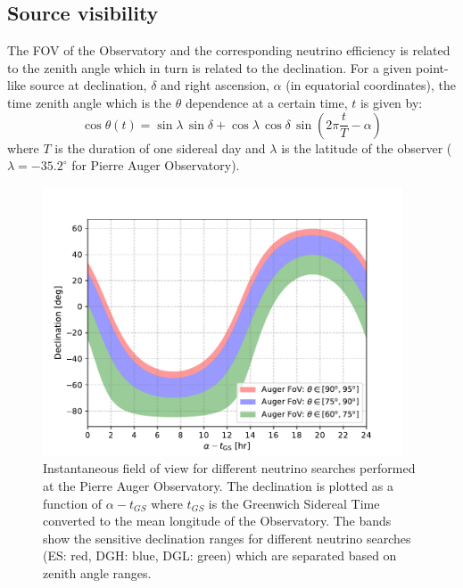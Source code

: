 \subsection{Source visibility}
\label{subsec:psource_coverage}
The \gls{FOV} of the Observatory and the corresponding neutrino efficiency is related to the zenith angle which in turn is related to the declination. For a given point-like source at declination, $\delta$ and right ascension, $\alpha$ (in equatorial coordinates), the time zenith angle which is the $\theta$ dependence at a certain time, $t$ is given by:
\begin{equation}
  \label{eq:zenith_angle_time}
  \cos \theta(t) = \sin \lambda \,\sin \delta+ \cos \lambda \, \cos \delta \,\sin (2\pi \frac{t}{T} - \alpha)
\end{equation} 
where $T$ is the duration of one sidereal day and $\lambda$ is the latitude of the observer ($\lambda = -35.2^{\circ}$ for Pierre Auger Observatory). 

\begin{figure}[t!]
  \centering
  \includegraphics[width=0.95\textwidth]{thesis_figures/PointLimits/Auger_FoV_1.pdf}
  \caption{Instantaneous field of view for different neutrino searches performed at the Pierre Auger Observatory. The declination is plotted as a function of $\alpha - t_{GS}$ where $t_{GS}$ is the Greenwich Sidereal Time converted to the mean longitude of the Observatory. The bands show the sensitive declination ranges for different neutrino searches (ES: red, DGH: blue, DGL: green) which are separated based on zenith angle ranges.}
  \label{fig:Auger_FoV}
\end{figure}

